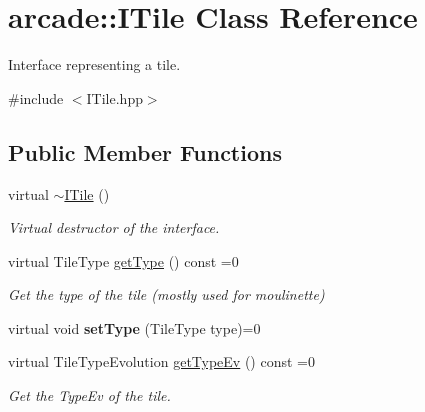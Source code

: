 \hypertarget{classarcade_1_1ITile}{}\section{arcade\+:\+:I\+Tile Class Reference}
\label{classarcade_1_1ITile}


Interface representing a tile.  




{\ttfamily \#include $<$I\+Tile.\+hpp$>$}

\subsection*{Public Member Functions}
\begin{DoxyCompactItemize}
\item 
\mbox{\label{classarcade_1_1ITile_a45fb2120945fbddafb4b963d969a5b80}} 
virtual \hyperlink{classarcade_1_1ITile_a45fb2120945fbddafb4b963d969a5b80}{$\sim$\+I\+Tile} ()
\begin{DoxyCompactList}\small\item\em Virtual destructor of the interface. \end{DoxyCompactList}\item 
\mbox{\label{classarcade_1_1ITile_a33b93e772d47a76ccec2e4ace26f5d19}} 
virtual Tile\+Type \hyperlink{classarcade_1_1ITile_a33b93e772d47a76ccec2e4ace26f5d19}{get\+Type} () const =0
\begin{DoxyCompactList}\small\item\em Get the type of the tile (mostly used for moulinette) \end{DoxyCompactList}\item 
\mbox{\label{classarcade_1_1ITile_abb62070eedbeb35e52c1dd8be5321bd4}} 
virtual void {\bfseries set\+Type} (Tile\+Type type)=0
\item 
\mbox{\label{classarcade_1_1ITile_acbd70cc31a588583c82af105ab7ac575}} 
virtual Tile\+Type\+Evolution \hyperlink{classarcade_1_1ITile_acbd70cc31a588583c82af105ab7ac575}{get\+Type\+Ev} () const =0
\begin{DoxyCompactList}\small\item\em Get the Type\+Ev of the tile. \end{DoxyCompactList}\item 

\end{DoxyCompactItemize}
